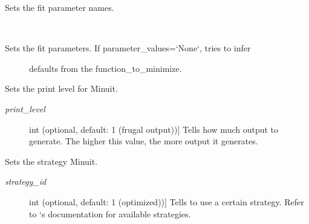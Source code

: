 \documentclass[a4paper,10pt,english]{sphinxmanual}
\begin{document}
\begin{fulllineitems}

\begin{fulllineitems}
\label{index:kafe.iminuit_wrapper.IMinuit.set_parameter_names}
Sets the fit parameter names.

\end{fulllineitems}


\begin{fulllineitems}
\label{index:kafe.iminuit_wrapper.IMinuit.set_parameter_values}~\begin{description}
\item[{Sets the fit parameters. If parameter\_values={}`None{}`, tries to infer}] \leavevmode
defaults from the function\_to\_minimize.

\end{description}

\end{fulllineitems}


\begin{fulllineitems}
\label{index:kafe.iminuit_wrapper.IMinuit.set_print_level}
Sets the print level for Minuit.
\begin{description}
\item[{\emph{print\_level}}] \leavevmode{[}int (optional, default: 1 (frugal output)){]}
Tells  how much output to generate. The higher this
value, the more output it generates.

\end{description}

\end{fulllineitems}


\begin{fulllineitems}
\label{index:kafe.iminuit_wrapper.IMinuit.set_strategy}
Sets the strategy Minuit.
\begin{description}
\item[{\emph{strategy\_id}}] \leavevmode{[}int (optional, default: 1 (optimized)){]}
Tells  to use a certain strategy. Refer to `s
documentation for available strategies.


\end{description}
\end{fulllineitems}
\end{fulllineitems}
\end{document}
